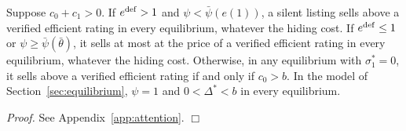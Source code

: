 \begin{corollary}
\label{cor:att_ordering}
Suppose $c_0+c_1>0$. If $e^{\rm def}>1$ and $\psi<\bar\psi(e(1))$, a silent listing sells above a verified efficient rating in every equilibrium, whatever the hiding cost. If $e^{\rm def}\le1$ or $\psi\ge\bar\psi(\bar\theta)$, it sells at most at the price of a verified efficient rating in every equilibrium, whatever the hiding cost. Otherwise, in any equilibrium with $\sigma_1^*=0$, it sells above a verified efficient rating if and only if $c_0>b$. In the model of Section~\ref{sec:equilibrium}, $\psi=1$ and $0<\Delta^*<b$ in every equilibrium.
\end{corollary}

\noindent\textit{Proof.} See Appendix~\ref{app:attention}. $\Box$

